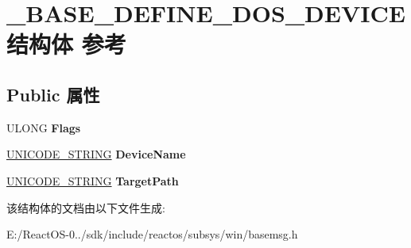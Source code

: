 \hypertarget{struct___b_a_s_e___d_e_f_i_n_e___d_o_s___d_e_v_i_c_e}{}\section{\+\_\+\+B\+A\+S\+E\+\_\+\+D\+E\+F\+I\+N\+E\+\_\+\+D\+O\+S\+\_\+\+D\+E\+V\+I\+C\+E结构体 参考}
\label{struct___b_a_s_e___d_e_f_i_n_e___d_o_s___d_e_v_i_c_e}
\subsection*{Public 属性}
\begin{DoxyCompactItemize}
\item 
\mbox{\label{struct___b_a_s_e___d_e_f_i_n_e___d_o_s___d_e_v_i_c_e_a69b1693de7b089935a955c9d57cb5b98}} 
U\+L\+O\+NG {\bfseries Flags}
\item 
\mbox{\label{struct___b_a_s_e___d_e_f_i_n_e___d_o_s___d_e_v_i_c_e_a734924dffcd859e13824d637302ad000}} 
\hyperlink{struct___u_n_i_c_o_d_e___s_t_r_i_n_g}{U\+N\+I\+C\+O\+D\+E\+\_\+\+S\+T\+R\+I\+NG} {\bfseries Device\+Name}
\item 
\mbox{\label{struct___b_a_s_e___d_e_f_i_n_e___d_o_s___d_e_v_i_c_e_a44c4a536c04afb2a0ce29006a8a818ca}} 
\hyperlink{struct___u_n_i_c_o_d_e___s_t_r_i_n_g}{U\+N\+I\+C\+O\+D\+E\+\_\+\+S\+T\+R\+I\+NG} {\bfseries Target\+Path}
\end{DoxyCompactItemize}


该结构体的文档由以下文件生成\+:\begin{DoxyCompactItemize}
\item 
E\+:/\+React\+O\+S-\/0../sdk/include/reactos/subsys/win/basemsg.\+h\end{DoxyCompactItemize}

